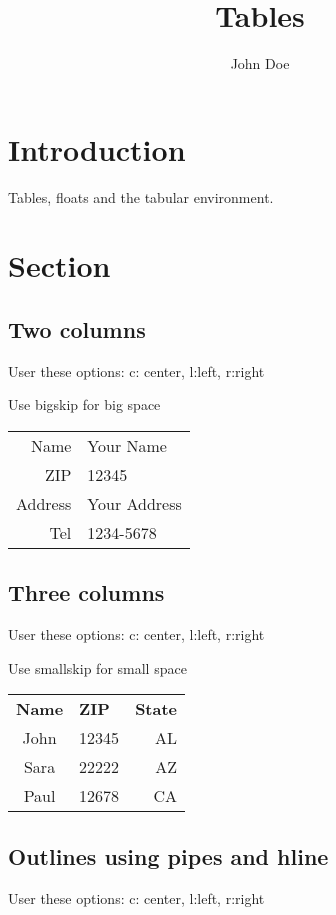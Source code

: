 \documentclass{article}
\title{Tables}
\author{John Doe}
\date{}
\begin{document}
\maketitle
\section{Introduction}

Tables, floats and the tabular environment.

\section{Section}
\subsection{Two columns}
User these options: c: center, l:left, r:right

\noindent
Use bigskip for big space

\bigskip
\begin{tabular}{rl}
	Name    & Your Name    \\
	ZIP     & 12345        \\
	Address & Your Address \\
	Tel     & 1234-5678    \\
\end{tabular}


\subsection{Three columns}
User these options: c: center, l:left, r:right

\noindent
Use smallskip for small space

\smallskip

\begin{tabular}{clr}
	\textbf{Name} & \textbf{ZIP} & \textbf{State} \\
	John          & 12345        & AL             \\
	Sara          & 22222        & AZ             \\
	Paul          & 12678        & CA             \\
\end{tabular}


\subsection{Outlines using pipes and hline}
User these options: c: center, l:left, r:right
\end{document}
